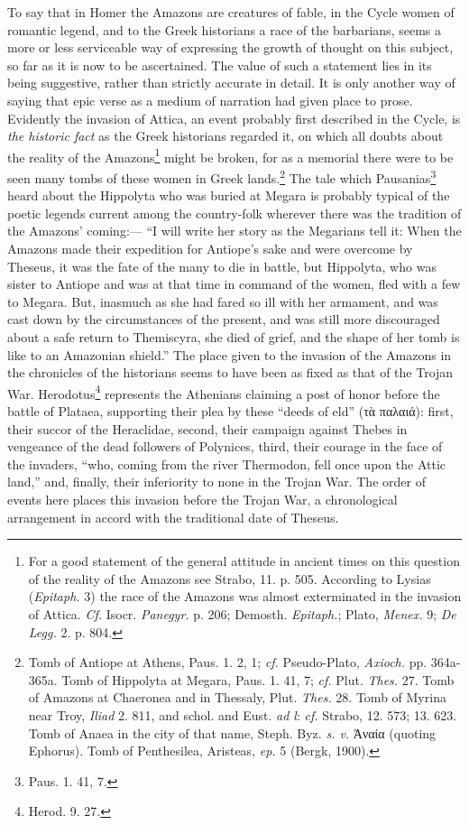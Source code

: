 \documentclass[a4paper, 12pt, oneside]{article}
\begin{document}
To say that in Homer the Amazons are creatures of fable, in the Cycle women of romantic legend, and to the Greek historians a race of the barbarians, seems a more or less serviceable way of expressing the growth of thought on this subject, so far as it is now to be ascertained. The value of such a statement lies in its being suggestive, rather than strictly accurate in detail. It is only another way of saying that epic verse as a medium of narration had given place to prose. Evidently the invasion of Attica, an event probably first described in the Cycle, is \emph{the historic fact} as the Greek historians regarded it, on which all doubts about the reality of the Amazons\footnote{For a good statement of the general attitude in ancient times on this question of the reality of the Amazons see Strabo, 11. p. 505. According to Lysias (\emph{Epitaph.} 3) the race of the Amazons was almost exterminated in the invasion of Attica. \emph{Cf.} Isocr. \emph{Panegyr.} p. 206; Demosth. \emph{Epitaph.}; Plato, \emph{Menex.} 9; \emph{De Legg.} 2. p. 804.} might be broken, for as a memorial there were to be seen many tombs of these women in Greek lands.\footnote{Tomb of Antiope at Athens, Paus. 1. 2, 1; \emph{cf.} Pseudo-Plato, \emph{Axioch.} pp. 364a-365a. Tomb of Hippolyta at Megara, Paus. 1. 41, 7; \emph{cf.} Plut. \emph{Thes.} 27. Tomb of Amazons at Chaeronea and in Thessaly, Plut. \emph{Thes.} 28. Tomb of Myrina near Troy, \emph{Iliad} 2. 811, and schol. and Eust. \emph{ad l}: \emph{cf.} Strabo, 12. 573; 13. 623. Tomb of Anaea in the city of that name, Steph. Byz. \emph{s. v.} Ἀναία (quoting Ephorus). Tomb of Penthesilea, Aristeas, \emph{ep.} 5 (Bergk, 1900).} The tale which Pausanias\footnote{Paus. 1. 41, 7.} heard about the Hippolyta who was buried at Megara is probably typical of the poetic legends current among the country-folk wherever there was the tradition of the Amazons' coming:--- ``I will write her story as the Megarians tell it: When the Amazons made their expedition for Antiope's sake and were overcome by Theseus, it was the fate of the many to die in battle, but Hippolyta, who was sister to Antiope and was at that time in command of the women, fled with a few to Megara. But, inasmuch as she had fared so ill with her armament, and was cast down by the circumstances of the present, and was still more discouraged about a safe return to Themiscyra, she died of grief, and the shape of her tomb is like to an Amazonian shield.'' The place given to the invasion of the Amazons in the chronicles of the historians seems to have been as fixed as that of the Trojan War. Herodotus\footnote{Herod. 9. 27.} represents the Athenians claiming a post of honor before the battle of Plataea, supporting their plea by these ``deeds of eld'' (τὰ παλαιά): first, their succor of the Heraclidae, second, their campaign against Thebes in vengeance of the dead followers of Polynices, third, their courage in the face of the invaders, ``who, coming from the river Thermodon, fell once upon the Attic land,'' and, finally, their inferiority to none in the Trojan War. The order of events here places this invasion before the Trojan War, a chronological arrangement in accord with the traditional date of Theseus.
\end{document}
